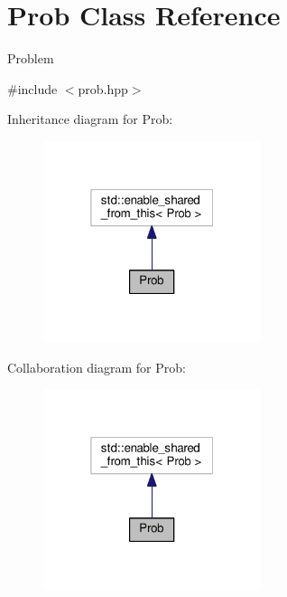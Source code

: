 \hypertarget{classProb}{\section{Prob Class Reference}
\label{classProb}
}


Problem  




{\ttfamily \#include $<$prob.\+hpp$>$}



Inheritance diagram for Prob\+:\nopagebreak
\begin{figure}[H]
\begin{center}
\leavevmode
\includegraphics[width=181pt]{classProb__inherit__graph}
\end{center}
\end{figure}


Collaboration diagram for Prob\+:\nopagebreak
\begin{figure}[H]
\begin{center}
\leavevmode
\includegraphics[width=181pt]{classProb__coll__graph}
\end{center}
\end{figure}
